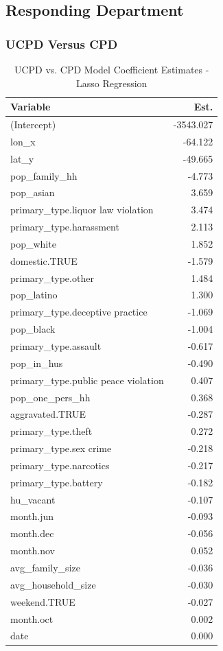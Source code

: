 \documentclass{ucetd}
\begin{document}
\hypertarget{responding-department}{%
\subsection{Responding Department}\label{responding-department}}

\hypertarget{ucpd-versus-cpd}{%
\subsubsection{UCPD Versus CPD}\label{ucpd-versus-cpd}}

\begin{table}

\caption{\label{tab:ucpd-lasso}UCPD vs. CPD Model Coefficient Estimates - Lasso Regression}
\centering
\begin{tabular}[t]{l|r}
\hline
Variable & Est.\\
\hline
(Intercept) & -3543.027\\
\hline
lon\_x & -64.122\\
\hline
lat\_y & -49.665\\
\hline
pop\_family\_hh & -4.773\\
\hline
pop\_asian & 3.659\\
\hline
primary\_type.liquor law violation & 3.474\\
\hline
primary\_type.harassment & 2.113\\
\hline
pop\_white & 1.852\\
\hline
domestic.TRUE & -1.579\\
\hline
primary\_type.other & 1.484\\
\hline
pop\_latino & 1.300\\
\hline
primary\_type.deceptive practice & -1.069\\
\hline
pop\_black & -1.004\\
\hline
primary\_type.assault & -0.617\\
\hline
pop\_in\_hus & -0.490\\
\hline
primary\_type.public peace violation & 0.407\\
\hline
pop\_one\_pers\_hh & 0.368\\
\hline
aggravated.TRUE & -0.287\\
\hline
primary\_type.theft & 0.272\\
\hline
primary\_type.sex crime & -0.218\\
\hline
primary\_type.narcotics & -0.217\\
\hline
primary\_type.battery & -0.182\\
\hline
hu\_vacant & -0.107\\
\hline
month.jun & -0.093\\
\hline
month.dec & -0.056\\
\hline
month.nov & 0.052\\
\hline
avg\_family\_size & -0.036\\
\hline
avg\_household\_size & -0.030\\
\hline
weekend.TRUE & -0.027\\
\hline
month.oct & 0.002\\
\hline
date & 0.000\\
\hline
\end{tabular}
\end{table}
\end{document}
